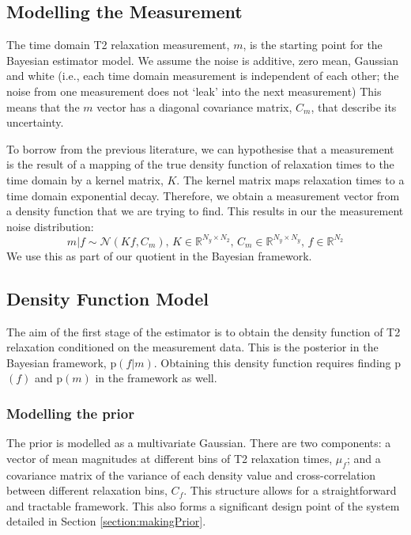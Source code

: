 \subsection{Modelling the Measurement}
The time domain T2 relaxation measurement, $m$, is the starting point for the Bayesian estimator model. We assume the noise is additive, zero mean, Gaussian and white (i.e., each time domain measurement is independent of each other; the noise from one measurement does not `leak' into the next measurement) This means that the $m$ vector has a diagonal covariance matrix, $C_m$, that describe its uncertainty.


To borrow from the previous literature, we can hypothesise that a measurement is the result of a mapping of the true density function of relaxation times to the time domain by a kernel matrix, $K$. The kernel matrix maps relaxation times to a time domain exponential decay. Therefore, we obtain a measurement vector from a density function that we are trying to find. This results in our the measurement noise distribution:
\begin{equation}
    \label{eq:bayes_measure_given_function}
    m|f \sim \mathcal{N}(Kf, C_m) \text{,   } K \in \mathbb{R}^{N_y \times N_{2}}
    \text{,   } C_m \in \mathbb{R}^{N_y \times N_y} \text{,   } f \in \mathbb{R}^{N_{2}}
\end{equation}
We use this as part of our quotient in the Bayesian framework.  



\subsection{Density Function Model}
The aim of the first stage of the estimator is to obtain the density function of T2 relaxation conditioned on the measurement data. This is the posterior in the Bayesian framework, p$(f|m)$. Obtaining this density function requires finding p$(f)$ and p$(m)$ in the framework as well. 

\subsubsection{Modelling the prior}
The prior is modelled as a multivariate Gaussian. There are two components: a vector of mean magnitudes at different bins of T2 relaxation times, $ \mu_f $; and a covariance matrix of the variance of each density value and cross-correlation between different relaxation bins, $C_f$. This structure allows for a straightforward and tractable framework. This also forms a significant design point of the system detailed in Section \ref{section:makingPrior}.


